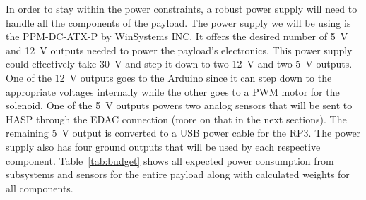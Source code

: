 In order to stay within the power constraints, a robust power supply will need to  handle all the components of the payload.  The power supply we will be using is the PPM-DC-ATX-P by WinSystems INC.  It offers the desired number of \SI{+5}{\volt} and \SI{+12}{\volt} outputs needed to power the payload's electronics.  This power supply could effectively take \SI{+30}{\volt} and step it down to two \SI{+12}{\volt} and two \SI{+5 }{\volt} outputs.  One of the \SI{+12}{\volt} outputs goes to the Arduino since it can step down to the appropriate voltages internally while the other goes to a PWM motor for the solenoid.  One of the \SI{+5 }{\volt} outputs powers two analog sensors that will be sent to HASP through the EDAC connection (more on that in the next sections).  The remaining \SI{+5 }{\volt} output is converted to a USB power cable for the RP3.  The power supply also has four ground outputs that will be used by each respective component. Table~\ref{tab:budget} shows all expected power consumption from subsystems and sensors for the entire payload along with calculated weights for all components.

